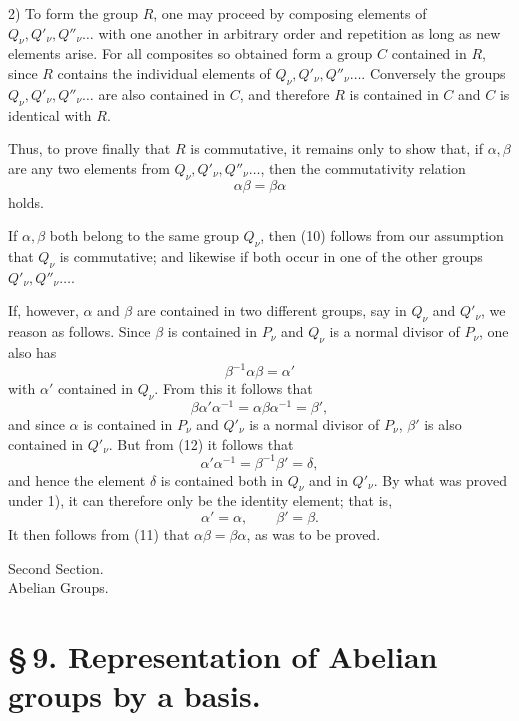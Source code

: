 \documentclass[11pt]{article}
\begin{document}
2) To form the group $R$, one may proceed by composing elements of $Q_\nu,Q'_\nu,Q''_\nu\ldots$ with one another in arbitrary order and repetition as long as new elements arise. For all composites so obtained form a group $C$ contained in $R$, since $R$ contains the individual elements of $Q_\nu,Q'_\nu,Q''_\nu\ldots$. Conversely the groups $Q_\nu,Q'_\nu,Q''_\nu\ldots$ are also contained in $C$, and therefore $R$ is contained in $C$ and $C$ is identical with $R$.

Thus, to prove finally that $R$ is commutative, it remains only to show that, if $\alpha,\beta$ are any two elements from $Q_\nu,Q'_\nu,Q''_\nu\ldots$, then the commutativity relation
\begin{equation}
\alpha\beta=\beta\alpha
\tag{10}
\end{equation}
holds.

If $\alpha,\beta$ both belong to the same group $Q_\nu$, then (10) follows from our assumption that $Q_\nu$ is commutative; and likewise if both occur in one of the other groups $Q'_\nu,Q''_\nu\ldots$.

If, however, $\alpha$ and $\beta$ are contained in two different groups, say in $Q_\nu$ and $Q'_\nu$, we reason as follows. Since $\beta$ is contained in $P_\nu$ and $Q_\nu$ is a normal divisor of $P_\nu$, one also has
\begin{equation}
\beta^{-1}\alpha\beta=\alpha'
\tag{11}
\end{equation}
with $\alpha'$ contained in $Q_\nu$. From this it follows that
\begin{equation}
\beta\alpha'\alpha^{-1}=\alpha\beta\alpha^{-1}=\beta',
\tag{12}
\end{equation}
and since $\alpha$ is contained in $P_\nu$ and $Q'_\nu$ is a normal divisor of $P_\nu$, $\beta'$ is also contained in $Q'_\nu$. But from (12) it follows that
\[
\alpha'\alpha^{-1}=\beta^{-1}\beta'=\delta,
\]
and hence the element $\delta$ is contained both in $Q_\nu$ and in $Q'_\nu$. By what was proved under 1), it can therefore only be the identity element; that is,
\[
\alpha'=\alpha,
\qquad
\beta'=\beta.
\]
It then follows from (11) that $\alpha\beta=\beta\alpha$, as was to be proved.

\clearpage

\begin{center}
{\large Second Section.}\\[0.35em]
{\Large Abelian Groups.}
\end{center}

\section*{\S\,9. Representation of Abelian groups by a basis.}
\end{document}
